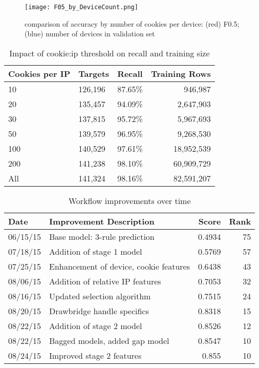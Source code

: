 \documentclass[9pt, journal]{IEEEtran}
\begin{document}
\begin{figure}[H]
   \centering
   \texttt{[image: F05\_by\_DeviceCount.png]}
   \caption{comparison of accuracy by number of cookies per device: (red) F0.5; (blue) number of devices in validation set}
   \label{fig:F05_by_DeviceCount}
\end{figure}

\begin{table}[H]
\centering
\begin{tabular}{l l l r}
\hline
\textbf{Cookies per IP} & \textbf{Targets} & \textbf{Recall} & \textbf{Training Rows} \\
\hline
10 & 126,196 & 87.65\% & 946,987 \tabularnewline
20 & 135,457 & 94.09\% & 2,647,903 \tabularnewline
30 & 137,815 & 95.72\% & 5,967,693 \tabularnewline
50 & 139,579 & 96.95\% & 9,268,530 \tabularnewline
100 & 140,529 & 97.61\% & 18,952,539 \tabularnewline
200 & 141,238 & 98.10\% & 60,909,729 \tabularnewline
All & 141,324 & 98.16\% & 82,591,207 \tabularnewline
\hline
\end{tabular}
\caption{Impact of cookie:ip threshold on recall and training size}\label{table:cookiesPerIp}
\end{table}

\begin{table}[H]
\centering
\begin{tabular}{l l r r}
\hline
\textbf{Date} & \textbf{Improvement Description} & \textbf{Score} & \textbf{Rank} \tabularnewline
\hline
06/15/15 & Base model: 3-rule prediction & 0.4934 & 75 \tabularnewline
07/18/15 & Addition of stage 1 model & 0.5769 & 57 \tabularnewline
07/25/15 & Enhancement of device, cookie features & 0.6438 & 43 \tabularnewline
08/06/15 & Addition of relative IP features & 0.7053 & 32 \tabularnewline
08/16/15 & Updated selection algorithm & 0.7515 & 24 \tabularnewline
08/20/15 & Drawbridge handle specifics & 0.8318 & 15 \tabularnewline
08/22/15 & Addition of stage 2 model & 0.8526 & 12 \tabularnewline
08/22/15 & Bagged models, added gap model & 0.8547 & 10 \tabularnewline
08/24/15 & Improved stage 2 features & 0.855 & 10 \tabularnewline
\hline
\end{tabular}
\caption{Workflow improvements over time}\label{table:leaderboard}
\end{table}


% 
% 
% 
% 
\end{document}
